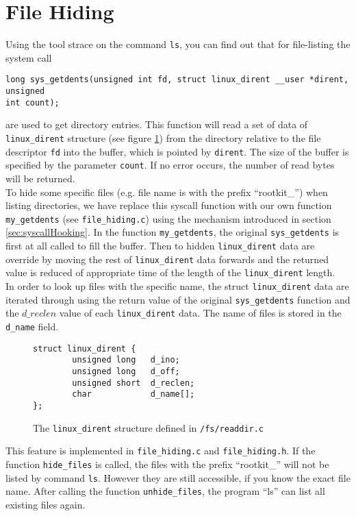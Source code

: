 \section{File Hiding}
Using the tool strace on the command \texttt{ls}, you can find out that for 
file-listing the system call 
\begin{center}
\lstset{escapechar=,style=customc}
\begin{lstlisting}
long sys_getdents(unsigned int fd, struct linux_dirent __user *dirent, unsigned 
int count);
\end{lstlisting}
\end{center}
are used to get directory entries. This function will read a set of data of 
\verb+linux_dirent+ structure (see figure \ref{ls:dirent}) from the directory 
relative to the file descriptor \texttt{fd} into the buffer, which is pointed 
by \texttt{dirent}. The size of the buffer is specified by the parameter 
\texttt{count}. If no error occurs, the number of read bytes will be returned.\\
To hide some specific files (e.g. file name is with the prefix ``rootkit\_'') 
when listing directories, we have replace this syscall function with our own 
function \texttt{my\_getdents} (see \texttt{file\_hiding.c}) using the mechanism 
introduced in section \ref{sec:syscallHooking}. In the function 
\texttt{my\_getdents}, the original \texttt{sys\_getdents} is first at all 
called to fill the buffer. Then to hidden \texttt{linux\_dirent} data are 
override by moving the rest of \texttt{linux\_dirent} data forwards and the 
returned value is reduced of appropriate time of the length of the 
\texttt{linux\_dirent} length.\\ 
In order to look up files with the specific name, the struct 
\texttt{linux\_dirent} data are iterated through using the return value of the 
original \texttt{sys\_getdents} function and the $d\_reclen$ value of each 
\texttt{linux\_dirent} data. The name of files is stored in the \texttt{d\_name} 
field. 
\begin{center}
\begin{figure}
\lstset{escapechar=,style=customc}
\begin{lstlisting}
struct linux_dirent {
        unsigned long   d_ino;
        unsigned long   d_off;
        unsigned short  d_reclen;
        char            d_name[];
};
\end{lstlisting}
\caption{The \texttt{linux\_dirent} structure defined in \texttt{/fs/readdir.c}}
\label{ls:dirent}
\end{figure}
\end{center}
This feature is implemented in \texttt{file\_hiding.c} and \texttt{file\_hiding.h}. If the 
function \texttt{hide\_files} is called, the files with the prefix ``rootkit\_'' will 
not be listed by command \texttt{ls}. However they are still accessible, if you know 
the exact file name. After calling the function \texttt{unhide\_files}, the program 
``ls'' can list all existing files again. 
